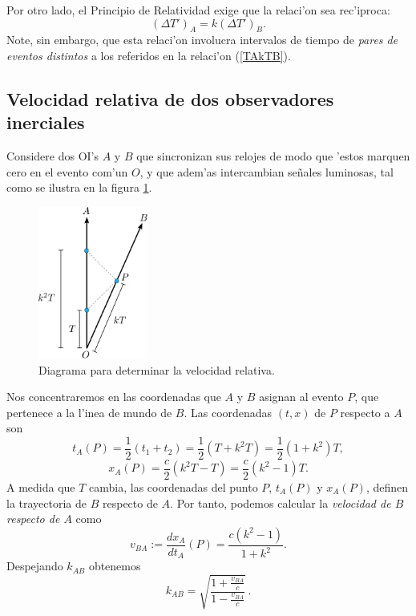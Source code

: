 Por otro lado, el Principio de Relatividad exige que la relaci'on sea rec'iproca:
\begin{equation}
(\Delta T')_A=k (\Delta T')_B .\label{tkt}
\end{equation}
Note, sin embargo, que esta relaci'on involucra intervalos de tiempo de \textit{pares de eventos distintos} a los referidos en la relaci'on (\ref{TAkTB}).

\subsection{Velocidad relativa de dos observadores inerciales}

Considere dos OI's $A$ y $B$ que sincronizan sus relojes de
modo que 'estos marquen cero en el evento com'un $O$, y que adem'as intercambian se\~nales luminosas, tal como se ilustra en la figura \ref{fig:k2}.
\begin{figure}[H]
\centerline{\includegraphics[height=5cm]{fig/fig-diagrama-velocidad-relativa.pdf}}
 \caption{Diagrama para determinar la velocidad relativa.}
\label{fig:k2}
\end{figure}
Nos concentraremos en las coordenadas que $A$ y $B$ asignan al evento $P$, que  pertenece a la l'inea de mundo de $B$. Las coordenadas $(t,x)$ de $P$
respecto a $A$ son
\begin{equation}
t_A(P)=\frac{1}{2}(t_1+t_2)=\frac{1}{2}(T + k^2T)=\frac{1}{2}(1+k^2)T,
\end{equation}
\begin{equation}
x_A(P)=\frac{c}{2}(k^2T-T)=\frac{c}{2}(k^2-1)T.
\end{equation}
A medida que $T$ cambia, las coordenadas del punto $P$, $t_A(P)$ y $x_A(P)$, definen la trayectoria de $B$ respecto de $A$. Por tanto, podemos calcular la \textit{velocidad de $B$ respecto de $A$} como
\begin{equation}
v_{BA}:=\frac{dx_A}{dt_A}(P)=\frac{c(k^2-1)}{1+k^2}.
\end{equation}
Despejando $k_{AB}$ obtenemos
\begin{equation}
k_{AB}=\sqrt{\frac{1+\frac{v_{BA}}{c}}{1-\frac{v_{BA}}{c}}} \,.\label{k}
\end{equation}

